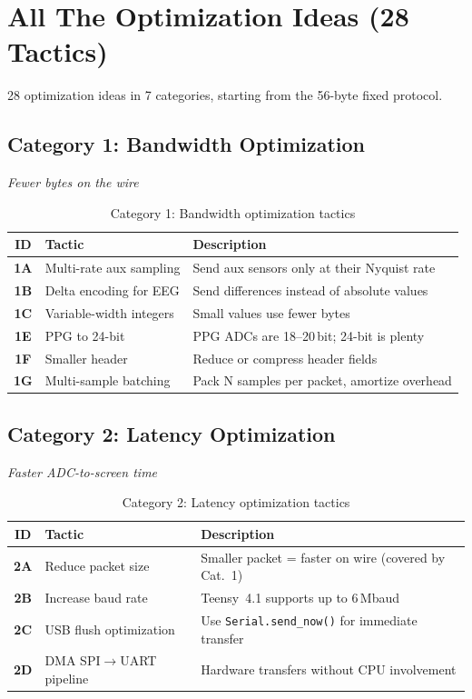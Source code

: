 \documentclass[11pt,a4paper]{article}
\newcommand{\tactic}[1]{\textbf{#1}}
\begin{document}
\section{All The Optimization Ideas (28 Tactics)}
\label{sec:taxonomy}

28 optimization ideas in 7 categories, starting from the 56-byte fixed protocol.

\subsection{Category 1: Bandwidth Optimization}
\textit{Fewer bytes on the wire}

\begin{table}[H]
\centering
\small
\begin{tabularx}{\textwidth}{|c|l|X|}
\hline
\textbf{ID} & \textbf{Tactic} & \textbf{Description} \\\hline
\tactic{1A} & Multi-rate aux sampling & Send aux sensors only at their Nyquist rate \\
\tactic{1B} & Delta encoding for EEG & Send differences instead of absolute values \\
\tactic{1C} & Variable-width integers & Small values use fewer bytes \\
\tactic{1E} & PPG to 24-bit & PPG ADCs are 18--20\,bit; 24-bit is plenty \\
\tactic{1F} & Smaller header & Reduce or compress header fields \\
\tactic{1G} & Multi-sample batching & Pack N samples per packet, amortize overhead \\
\hline
\end{tabularx}
\caption{Category 1: Bandwidth optimization tactics}
\end{table}

\subsection{Category 2: Latency Optimization}
\textit{Faster ADC-to-screen time}

\begin{table}[H]
\centering
\small
\begin{tabularx}{\textwidth}{|c|l|X|}
\hline
\textbf{ID} & \textbf{Tactic} & \textbf{Description} \\\hline
\tactic{2A} & Reduce packet size & Smaller packet = faster on wire (covered by Cat.~1) \\
\tactic{2B} & Increase baud rate & Teensy~4.1 supports up to 6\,Mbaud \\
\tactic{2C} & USB flush optimization & Use \texttt{Serial.send\_now()} for immediate transfer \\
\tactic{2D} & DMA SPI$\to$UART pipeline & Hardware transfers without CPU involvement \\
\hline
\end{tabularx}
\caption{Category 2: Latency optimization tactics}
\end{table}
\end{document}
